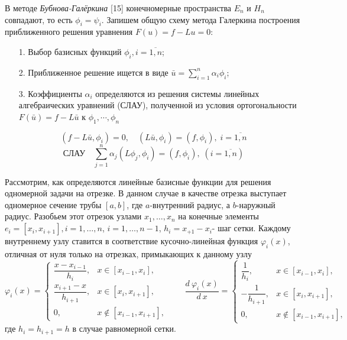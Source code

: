 \documentclass[a4paper,14pt]{extarticle}
\begin{document}
В методе \textit{Бубнова-Галёркина} [15] конечномерные пространства $E_n$ и $H_n$ совпадают, то есть $\phi_i=\psi_i$. Запишем общую схему метода Галеркина построения приближенного решения уравнения $F(u)=f-Lu=0$:
\begin{itemize}
\item[1.]Выбор базисных функций $\phi_i,i=\overline{1,n}$;
\item[2.]Приближенное решение ищется в виде $\bar{u}=\sum\limits_{i=1}^n{\alpha_i \phi_i}$;
\item[3.]Коэффициенты $\alpha_i$ определяются из решения системы линейных алгебраических уравнений (СЛАУ), полученной из условия ортогональности $F(\bar{u})=f-L\bar{u}$ к $\phi_1,\cdots,\phi_n$
\end{itemize}

\begin{equation*}
(f-L\bar{u},\phi_i)=0, \quad (L\bar{u},\phi_i)=(f,\phi_i), \; i=\overline{1,n}
\end{equation*}
\begin{equation*}
\text{СЛАУ} \quad \sum\limits_{j=1}^{n}{\alpha_j(L\phi_j,\phi_i)}=(f,\phi_i), \; (i=\overline{1,n})
\end{equation*}

Рассмотрим, как определяются линейные базисные функции для решения одномерной задачи на отрезке. В данном случае в качестве отрезка выступает одномерное сечение трубы $[a,b]$, где $a$-внутренний радиус, а $b$-наружный радиус. Разобьем этот отрезок узлами $x_1,\ldots,x_n$ на конечные элементы $e_i=[x_i,x_{i+1}],i=1,\ldots,n$, $i=1,\ldots,n-1$, $h_i=x_{+1}-x_i$- шаг сетки. Каждому внутреннему узлу ставится в соответствие кусочно-линейная функция $\varphi_i(x)$, отличная от нуля только на отрезках, примыкающих к данному узлу
\begin{equation*}
\varphi_i(x)=
\begin{cases}
\dfrac{x-x_{i-1}}{h_i}, & x\in \left[x_{i-1},x_i\right],\\
\dfrac{x_{i+1}-x}{h_{i+1}}, & x\in \left[x_i,x_{i+1}\right],\\
0, & x\notin\left[x_{i-1},x_{i+1}\right],
\end{cases}
\qquad  \dfrac{d\:\varphi_i(x)}{d\:x}=
\begin{cases}
\dfrac{1}{h_i}, & x\in \left[x_{i-1},x_i\right],\\
-\dfrac{1}{h_{i+1}}, & x\in \left[x_i,x_{i+1}\right],\\
0, & x\notin\left[x_{i-1},x_{i+1}\right],
\end{cases}
\end{equation*}
где $h_i=h_{i+1}=h$ в случае равномерной сетки.
\end{document}
